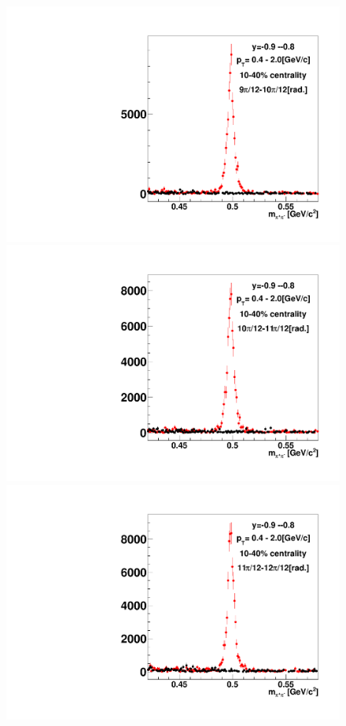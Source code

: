 \begin{figure}[h]
\includegraphics[width=0.14\linewidth]{chapterX/fig/ks_v1_sig/kf_ptslice0_cent1_ks_flow_phi10_rap13_check.pdf}
\includegraphics[width=0.14\linewidth]{chapterX/fig/ks_v1_sig/kf_ptslice0_cent1_ks_flow_phi11_rap13_check.pdf}
\includegraphics[width=0.14\linewidth]{chapterX/fig/ks_v1_sig/kf_ptslice0_cent1_ks_flow_phi12_rap13_check.pdf}


\end{figure}
